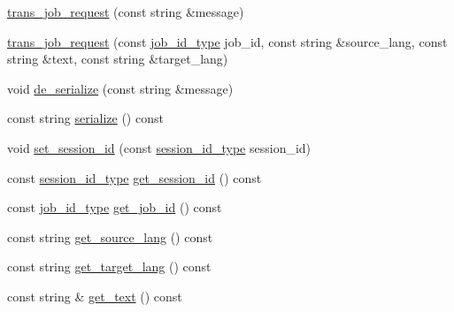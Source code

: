 \begin{DoxyCompactItemize}
\item 
\hyperlink{classuva_1_1smt_1_1bpbd_1_1common_1_1messaging_1_1trans__job__request_a1716fdfe0aff7aa3b613860995f3ad01}{trans\+\_\+job\+\_\+request} (const string \&message)
\item 
\hyperlink{classuva_1_1smt_1_1bpbd_1_1common_1_1messaging_1_1trans__job__request_ab673f9d56cb4b9e87f5f0a008419c321}{trans\+\_\+job\+\_\+request} (const \hyperlink{namespaceuva_1_1smt_1_1bpbd_1_1common_1_1messaging_af12d41e7490214ac057969e9d4af1436}{job\+\_\+id\+\_\+type} job\+\_\+id, const string \&source\+\_\+lang, const string \&text, const string \&target\+\_\+lang)
\item 
void \hyperlink{classuva_1_1smt_1_1bpbd_1_1common_1_1messaging_1_1trans__job__request_aeac32b42f5118816df664bf50124035e}{de\+\_\+serialize} (const string \&message)
\item 
const string \hyperlink{classuva_1_1smt_1_1bpbd_1_1common_1_1messaging_1_1trans__job__request_a911f136256ac5245060cba3bf0be28ed}{serialize} () const 
\item 
void \hyperlink{classuva_1_1smt_1_1bpbd_1_1common_1_1messaging_1_1trans__job__request_a1ba9bf5f2315b9de58b105f01e051c8c}{set\+\_\+session\+\_\+id} (const \hyperlink{namespaceuva_1_1smt_1_1bpbd_1_1common_1_1messaging_a17ad17f94b78abb87ab5f3f3d6f09588}{session\+\_\+id\+\_\+type} session\+\_\+id)
\item 
const \hyperlink{namespaceuva_1_1smt_1_1bpbd_1_1common_1_1messaging_a17ad17f94b78abb87ab5f3f3d6f09588}{session\+\_\+id\+\_\+type} \hyperlink{classuva_1_1smt_1_1bpbd_1_1common_1_1messaging_1_1trans__job__request_a83cd363fff23deba471f915251001192}{get\+\_\+session\+\_\+id} () const 
\item 
const \hyperlink{namespaceuva_1_1smt_1_1bpbd_1_1common_1_1messaging_af12d41e7490214ac057969e9d4af1436}{job\+\_\+id\+\_\+type} \hyperlink{classuva_1_1smt_1_1bpbd_1_1common_1_1messaging_1_1trans__job__request_a6dbfb9696acf036811fe4e9d2f11a4aa}{get\+\_\+job\+\_\+id} () const 
\item 
const string \hyperlink{classuva_1_1smt_1_1bpbd_1_1common_1_1messaging_1_1trans__job__request_a61a2e12cdbb970b985f2c3802b87776a}{get\+\_\+source\+\_\+lang} () const 
\item 
const string \hyperlink{classuva_1_1smt_1_1bpbd_1_1common_1_1messaging_1_1trans__job__request_a0500f2e2bda7356205d3bfc36097e36c}{get\+\_\+target\+\_\+lang} () const 
\item 
const string \& \hyperlink{classuva_1_1smt_1_1bpbd_1_1common_1_1messaging_1_1trans__job__request_a9f77f64de2dd4ea6d1cc23a86563644e}{get\+\_\+text} () const 
\end{DoxyCompactItemize}
